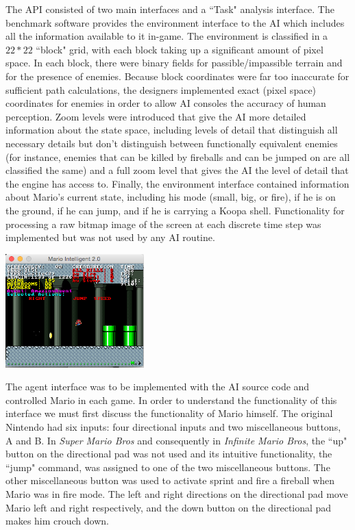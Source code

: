\documentclass[12pt]{article}
\begin{document}
\begin{multicols}{2}
The API consisted of two main interfaces and a ``Task" analysis interface. The benchmark software provides the environment interface 
to the AI which includes all the information available to it in-game. The environment is classified in a $22 * 22$ ``block" grid, with each block 
taking up a significant amount of pixel space. In each block, there were binary fields for passible/impassible terrain and for the presence of enemies. 
Because block coordinates were far too inaccurate for sufficient path calculations, the designers implemented exact (pixel space) coordinates for 
enemies in order to allow AI consoles the accuracy of human perception. Zoom levels were introduced that give the AI more detailed information about the 
state space, including levels of detail that distinguish all necessary details but don't distinguish between functionally equivalent enemies (for instance, enemies that 
can be killed by fireballs and can be jumped on are all classified the same) and a full zoom level that gives the AI the level of detail that the engine has access to.
Finally, the environment interface contained information about Mario's current state, including his mode (small, big, or fire), if he is on the ground, if he can jump, 
and if he is carrying a Koopa shell. Functionality for processing a raw bitmap image of the screen at each discrete time step was implemented but was not used by any AI routine.

\begingroup
    \centering
    \includegraphics[width=0.4\textwidth]{Small}
\endgroup

The agent interface was to be implemented with the AI source code and controlled Mario in each game. In order to understand the functionality of this interface we 
must first discuss the functionality of Mario himself. The original Nintendo had six inputs: four directional inputs and two miscellaneous buttons, A and B. 
In \textit{Super Mario Bros} and consequently in \textit{Infinite Mario Bros}, the ``up" button on the directional pad was not used and its intuitive functionality, 
the ``jump" command, was assigned to one of the two miscellaneous buttons. The other miscellaneous button was used to activate sprint and fire a fireball 
when Mario was in fire mode. The left and right directions on the directional pad move Mario left and right respectively, and the down button on the directional 
pad makes him crouch down. 
\hspace{5mm}
\\


\end{multicols}
\end{document}
